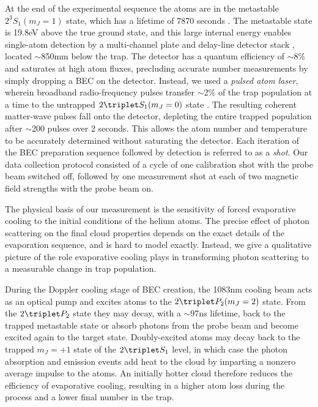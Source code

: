 At the end of the experimental sequence the atoms are in the metastable $2^3S_1(m_J=1)$ state, which has a lifetime of $7870$ seconds \cite{Hodgman09}. The metastable state is 19.8eV above the true ground state, and this large internal energy enables single-atom detection by a multi-channel plate and delay-line detector stack \cite{Manning10}, located $\sim$850mm below the trap. The detector has a quantum efficiency of $\sim 8\%$ and saturates at high atom fluxes, precluding accurate number measurements by simply dropping a BEC on the detector. Instead, we used a \emph{pulsed atom laser}, wherein broadband radio-frequency pulses transfer $\sim$2\% of the trap population {at a time} to the untrapped $2\triplet S_1(m_J=0)$ state \cite{Manning10,Henson18}. The resulting coherent matter-wave pulse{s} fall onto the detector, {depleting the entire trapped population after $\sim$200 pulses over 2 seconds. This allows}  the atom number and temperature to be accurately determined without saturating the detector. Each iteration of the BEC preparation sequence followed by detection is referred to as a \emph{shot}. Our data collection protocol consisted of a cycle of one calibration shot with the probe beam switched off, followed by one measurement shot at each of two magnetic field strengths with the probe beam on. 

The physical basis of our measurement is the sensitivity of forced evaporative cooling to the initial conditions of the helium atoms. The precise effect of photon scattering on the final cloud properties depends on the exact details of the evaporation sequence, and is hard to model exactly. Instead, we give a qualitative picture of the role evaporative cooling plays in transforming photon scattering to a measurable change in trap population. 

During the Doppler cooling stage of BEC creation, the 1083nm cooling beam acts as an optical pump and excites atoms to the $2\triplet P_2(m_J=2)$ state. From the $2\triplet P_2$ state they may decay, with a $\sim$97ns lifetime, back to the trapped metastable state or absorb photons from the probe beam and become excited again to the target state. Doubly-excited atoms may decay back to the trapped $m_J=+1$ state of the $2\triplet S_1$ level, in which case the photon absorption and emission events add heat to the cloud by imparting a nonzero average impulse to the atoms. An initially hotter cloud therefore reduces the efficiency of evaporative cooling, resulting in a higher atom loss during the process and a lower final number in the trap. 


